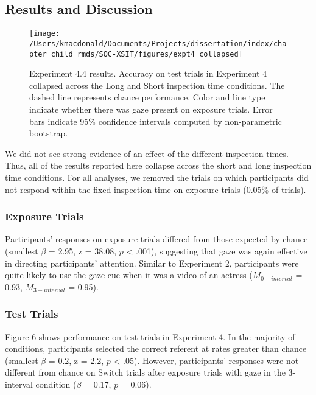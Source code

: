 \documentclass[oneside]{report}
\begin{document}
\hypertarget{results-and-discussion-3}{%
\subsection{Results and Discussion}\label{results-and-discussion-3}}
\begin{figure}[t]

{\centering \texttt{[image: /Users/kmacdonald/Documents/Projects/dissertation/index/chapter\_child\_rmds/SOC-XSIT/figures/expt4\_collapsed]} 

}

\caption[Experiment 4.4 results]{Experiment 4.4 results. Accuracy on test trials in Experiment 4 collapsed across the Long and Short inspection time conditions. The dashed line represents chance performance. Color and line type indicate whether there was gaze present on exposure trials. Error bars indicate 95\% confidence intervals computed by non-parametric bootstrap.}\label{fig:expt4-plot}
\end{figure}
We did not see strong evidence of an effect of the different inspection
times. Thus, all of the results reported here collapse across the short
and long inspection time conditions. For all analyses, we removed the
trials on which participants did not respond within the fixed inspection
time on exposure trials (0.05\% of trials).

\hypertarget{exposure-trials-3}{%
\subsubsection{Exposure Trials}\label{exposure-trials-3}}

Participants' responses on exposure trials differed from those expected
by chance (smallest \(\beta\) = 2.95, z = 38.08, \(p\) \textless{}
.001), suggesting that gaze was again effective in directing
participants' attention. Similar to Experiment 2, participants were
quite likely to use the gaze cue when it was a video of an actress
(\(M_{0-interval}\) = 0.93, \(M_{3-interval}\) = 0.95).

\hypertarget{test-trials-3}{%
\subsubsection{Test Trials}\label{test-trials-3}}

Figure 6 shows performance on test trials in Experiment 4. In the
majority of conditions, participants selected the correct referent at
rates greater than chance (smallest \(\beta\) = 0.2, z = 2.2, \(p\)
\textless{} .05). However, participants' responses were not different
from chance on Switch trials after exposure trials with gaze in the
3-interval condition (\(\beta\) = 0.17, \(p\) = 0.06).
\end{document}
